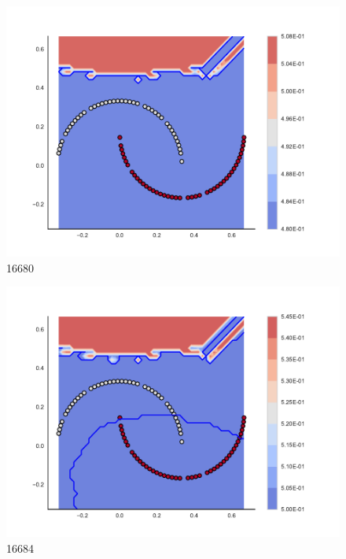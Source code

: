 \begin{subfigure}[b]{0.09\textwidth}
    \includegraphics[clip, trim=2.35cm 1.75cm 4.5cm 0cm,width=\textwidth]{img/convergence/16680.pdf}
    \caption{16680}
    \label{fig:convergence_16680}
\end{subfigure}
%
\begin{subfigure}[b]{0.09\textwidth}
    \includegraphics[clip, trim=2.35cm 1.75cm 4.5cm 0cm,width=\textwidth]{img/convergence/16684.pdf}
    \caption{16684}
    \label{fig:convergence_16684}
\end{subfigure}
%
